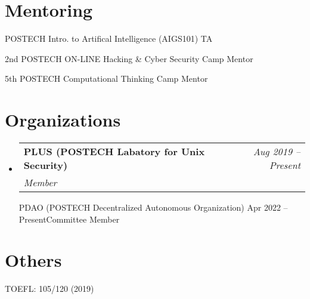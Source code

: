 \documentclass[letterpaper,11pt]{article}
\makeatletter
\newcommand{\resumeOrganizationHeading}[4]{
  \vspace{-2pt}\item
    \begin{tabular*}{0.97\textwidth}[t]{l@{\extracolsep{\fill}}r}
      \textbf{#1} & \textit{\small #2} \\
      \textit{\small#3}
    \end{tabular*}\vspace{-7pt}
}
\newcommand{\resumeSubHeadingListStart}{\begin{itemize}[leftmargin=0.15in, label={}]}
\newcommand{\resumeSubHeadingListEnd}{\end{itemize}}
\makeatother
\begin{document}

\section{Mentoring}
\vspace{3pt}
\resumeSubHeadingListStart
\small{
	\item {POSTECH Intro. to Artifical Intelligence (AIGS101) TA}
	\item {2nd POSTECH ON-LINE Hacking \& Cyber Security Camp Mentor}
	\item {5th POSTECH Computational Thinking Camp Mentor}
}
\resumeSubHeadingListEnd


\section{Organizations}
\vspace{3pt}
\resumeSubHeadingListStart

\resumeOrganizationHeading
{PLUS (POSTECH Labatory for Unix Security)}{Aug 2019 -- Present}{Member}

\resumeOrganizationHeading
{PDAO (POSTECH Decentralized Autonomous Organization)} {Apr 2022 -- Present}{Committee Member}

\resumeSubHeadingListEnd

\section{Others}
\vspace{3pt}
\resumeSubHeadingListStart
\small{
	\item {TOEFL: 105/120 (2019)}
}
\resumeSubHeadingListEnd





\end{document}
